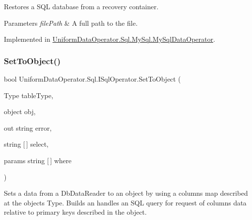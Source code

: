Restores a S\+QL database from a recovery container. 


\begin{DoxyParams}{Parameters}
{\em file\+Path} & A full path to the file.\\
\hline
\end{DoxyParams}


Implemented in \mbox{\hyperlink{class_uniform_data_operator_1_1_sql_1_1_my_sql_1_1_my_sql_data_operator_a22a9e92989ebdb3a52b8ebe409c59831}{Uniform\+Data\+Operator.\+Sql.\+My\+Sql.\+My\+Sql\+Data\+Operator}}.

\mbox{\label{interface_uniform_data_operator_1_1_sql_1_1_i_sql_operator_a9a1822fcafcb1a3abd59b40f2cef7930}} 
\subsubsection{\texorpdfstring{Set\+To\+Object()}{SetToObject()}\hspace{0.1cm}{\footnotesize\ttfamily [1/3]}}
{\footnotesize\ttfamily bool Uniform\+Data\+Operator.\+Sql.\+I\+Sql\+Operator.\+Set\+To\+Object (\begin{DoxyParamCaption}\item[{Type}]{table\+Type,  }\item[{object}]{obj,  }\item[{out string}]{error,  }\item[{string \mbox{[}$\,$\mbox{]}}]{select,  }\item[{params string \mbox{[}$\,$\mbox{]}}]{where }\end{DoxyParamCaption})}



Sets a data from a Db\+Data\+Reader to an object by using a columns map described at the object\textquotesingle{}s Type. Builds an handles an S\+QL query for request of columns data relative to primary keys described in the object. 



